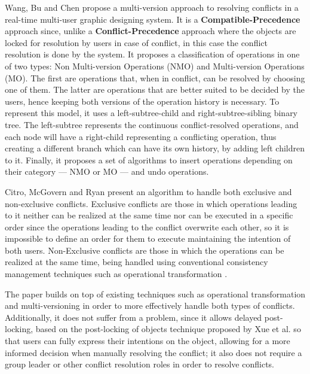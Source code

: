 Wang, Bu and Chen \cite{Wang2002} propose a multi-version approach to resolving conflicts in a real-time multi-user graphic designing system. It is a \textbf{Compatible-Precedence} approach since, unlike a \textbf{Conflict-Precedence} approach where the objects are locked for resolution by users in case of conflict, in this case the conflict resolution is done by the system. It proposes a classification of operations in one of two types: Non Multi-version Operations (NMO) and Multi-version Operations (MO). The first are operations that, when in conflict, can be resolved by choosing one of them. The latter are operations that are better suited to be decided by the users, hence keeping both versions of the operation history is necessary.
To represent this model, it uses a left-subtree-child and right-subtree-sibling binary tree. The left-subtree represents the continuous conflict-resolved operations, and each node will have a right-child representing a conflicting operation, thus creating a different branch which can have its own history, by adding left children to it. Finally, it proposes a set of algorithms to insert operations depending on their category --- NMO or MO --- and undo operations.

Citro, McGovern and Ryan \cite{Citro2007} present an algorithm to handle both exclusive and non-exclusive conflicts. Exclusive conflicts are those in which operations leading to it neither can be realized at the same time nor can be executed in a specific order since the operations leading to the conflict overwrite each other, so it is impossible to define an order for them to execute maintaining the intention of both users. Non-Exclusive conflicts are those in which the operations can be realized at the same time, being handled using conventional consistency management techniques such as operational transformation \cite{Ellis1989}.

The paper builds on top of existing techniques such as operational transformation and multi-versioning in order to more effectively handle both types of conflicts. Additionally, it does not suffer from a  problem, since it allows delayed post-locking, based on the post-locking of objects technique proposed by Xue et al. \cite{Xue2001} so that users can fully express their intentions on the object, allowing for a more informed decision when manually resolving the conflict; it also does not require a group leader or other conflict resolution roles in order to resolve conflicts.

